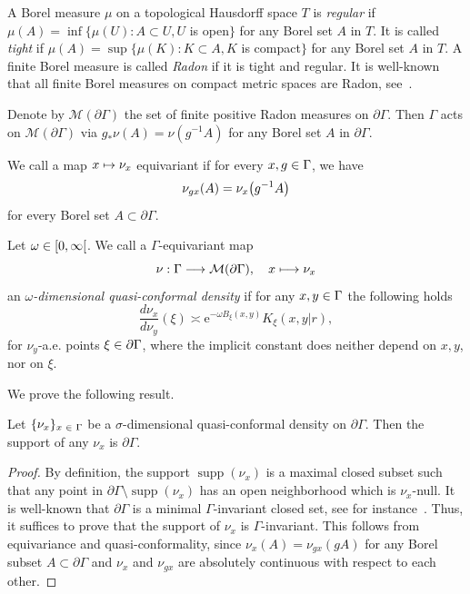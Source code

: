 \documentclass[AHL,Unicode,longabstracts]{cedram}
\newcommand{\pG}{\partial{\Gamma}}
\newcommand{\rme}{\mathrm{e}}
\newcommand{\clM}{\mathcal{M}}
\DeclareMathOperator{\supp}{supp}
\let\originalleft\left
\let\originalright\right
\renewcommand{\left}{\mathopen{}\mathclose\bgroup\originalleft}
\renewcommand{\right}{\aftergroup\egroup\originalright}
\let\oldin\in
\renewcommand{\in}{\mathchoice{\oldin}{\oldin}{\,\oldin\,}{\,\oldin\,}}
\renewcommand*{\to}{\mathchoice{\longrightarrow}{\rightarrow}{\rightarrow}{\rightarrow}}
\let\oldmapsto\mapsto
\renewcommand*{\mapsto}{\mathchoice{\longmapsto}{\oldmapsto}{\oldmapsto}{\oldmapsto}}
\begin{document}
A Borel measure $\mu$ on a topological Hausdorff space $T$ is \emph{regular} if $\mu(A) = \inf\{\mu(U): A \subset U, U$ is open$\}$ for any Borel set $A$ in $T$. It is called \emph{tight} if $\mu(A) =
\sup\{\mu(K): K \subset A, K$ is compact$\}$ for any Borel set $A$ in $T$. A finite Borel measure is called \emph{Radon} if it is tight and regular. It is well-known that all finite Borel measures on compact metric spaces are Radon, see~\cite[Theorem~1.1, Theorem~1.3]{Bill99}.

Denote by $\clM(\pG)$ the set of finite positive Radon measures on $\pG$. Then $\Gamma$ acts on $\clM(\pG)$ via $g_*\nu(A) = \nu(g^{-1}A)$ for any Borel set $A$ in $\pG$.

\begin{defi}
We call a map $x \mapsto \nu_x$ equivariant if for every $x,g\in \Gamma$, we have
\[
\nu_{gx}(A) = \nu_{x}\left(g^{-1}A\right)
\]
for every Borel set $A \subset\pG$.
\end{defi}



\begin{defi}
Let $\omega \in [0, \infty\mathclose{[}$. We call a $\Gamma$-equivariant map
\[
\nu: \Gamma \to
\clM(\pG),\quad x \mapsto \nu_x
\]
an
\emph{$\omega$-dimensional quasi-conformal density} if for any $x, y \in \Gamma$ the following holds
\begin{equation}\label{cdensitydef}
\frac{d\nu_{x}}{d\nu_{y}}(\xi) \asymp \rme^{-\omega B_\xi (x, y)}K_{\xi}(x,y|r),
\end{equation}
for $\nu_y$-a.e. points $\xi \in \pG$, where the implicit constant does neither depend on $x, y$, nor on $\xi$.
\end{defi}



We prove the following result.
\begin{lemm}
Let $\{\nu_x\}_{x\in\Gamma}$ be a $\sigma$-dimensional quasi-conformal density on $\pG$. Then the support of any $\nu_x$ is $\pG$.
\end{lemm}

\begin{proof}
By definition, the support $\supp(\nu_x)$ is a maximal closed subset such that any point in $\pG \setminus \supp(\nu_x)$ has an open neighborhood which is $\nu_x$-null. It is well-known that $\pG$ is a minimal $\Gamma$-invariant closed set, see for instance~\cite[Section~2]{Bo99}. Thus, it suffices to prove that the support of $\nu_x$ is $\Gamma$-invariant. This follows from equivariance and quasi-conformality, since $\nu_x(A)=\nu_{gx}(gA)$ for any Borel subset $A\subset \pG$ and $\nu_x$ and $\nu_{gx}$ are absolutely continuous with respect to each other.
\end{proof}
\end{document}
